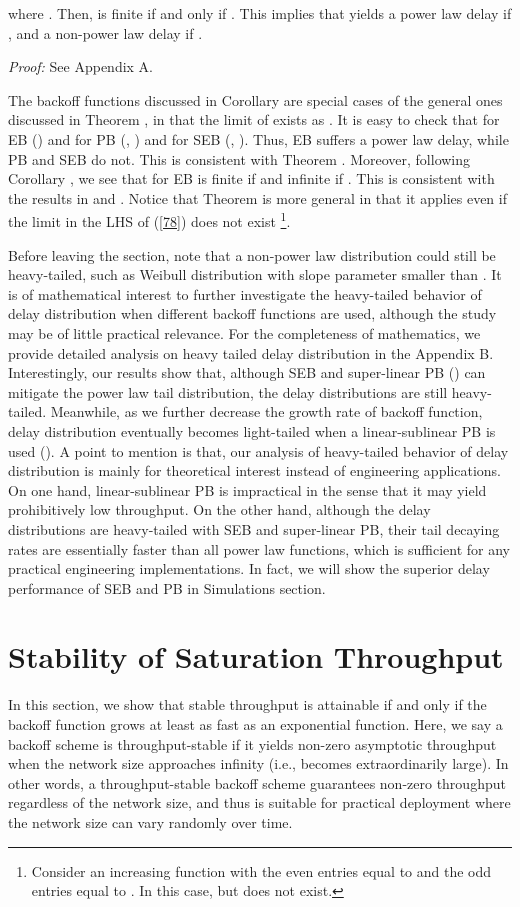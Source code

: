 \documentclass[journal]{IEEEtran}
\begin{document}
where . Then,  is finite if and only if . This implies that  yields a power law delay if , and a non-power law delay if .

\emph{Proof:} See Appendix A.  

The backoff functions discussed in Corollary  are special cases of the general ones discussed in Theorem , in that the limit of  exists as . It is easy to check that  for EB () and  for PB (, ) and  for SEB (, ). Thus, EB suffers a power law delay, while PB and SEB do not. This is consistent with Theorem . Moreover, following Corollary , we see that  for EB is finite if  and infinite if . This is consistent with the results in \cite{2009:Cho} and \cite{2007:Sakurai}. Notice that Theorem  is more general in that it applies even if the limit in the LHS of (\ref{78}) does not exist \footnote{Consider an increasing function  with the even entries equal to  and the odd entries equal to . In this case,  but  does not exist.}.

Before leaving the section, note that a non-power law distribution could still be heavy-tailed, such as Weibull distribution with slope parameter smaller than . It is of mathematical interest to further investigate the heavy-tailed behavior of delay distribution when different backoff functions are used, although the study may be of little practical relevance. For the completeness of mathematics, we provide detailed analysis on heavy tailed delay distribution in the Appendix B. Interestingly, our results show that, although SEB and super-linear PB () can mitigate the power law tail distribution, the delay distributions are still heavy-tailed. Meanwhile, as we further decrease the growth rate of backoff function, delay distribution eventually becomes light-tailed when a linear-sublinear PB is used (). A point to mention is that, our analysis of heavy-tailed behavior of delay distribution is mainly for theoretical interest instead of engineering applications. On one hand, linear-sublinear PB is impractical in the sense that it may yield prohibitively low throughput. On the other hand, although the delay distributions are heavy-tailed with SEB and super-linear PB, their tail decaying rates are essentially faster than all power law functions, which is sufficient for any practical engineering implementations. In fact, we will show the superior delay performance of SEB and PB in Simulations section.

\section{Stability of Saturation Throughput}
In this section, we show that stable throughput is attainable if and only if the backoff function grows at least as fast as an exponential function. Here, we say a backoff scheme is throughput-stable if it yields non-zero asymptotic throughput when the network size approaches infinity (i.e., becomes extraordinarily large). In other words, a throughput-stable backoff scheme guarantees non-zero throughput regardless of the network size, and thus is suitable for practical deployment where the network size can vary randomly over time.
\end{document}
